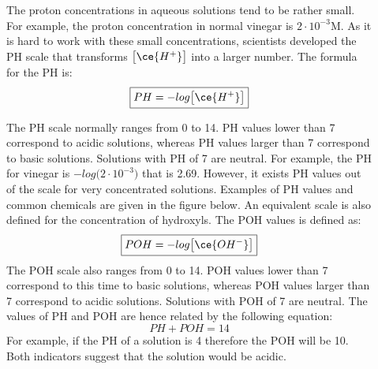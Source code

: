 \documentclass[main.tex]{subfiles}
\newcommand\chapterlabel{acids}
\begin{document}
\begin{description}
\item[] The proton concentrations in aqueous solutions tend to be rather small. For example, the proton concentration in normal vinegar is $2\cdot 10^{-3}$M. As it is hard to work with these small concentrations, scientists developed the PH scale that transforms $\big[ \ce{H^+}\big]$ into a larger number. The formula for the PH is:
\begin{equation}
\boxed{PH=-log \big[ \ce{H^+} \big]  }\label{\chapterlabel:equation3}
\end{equation}

 
The PH scale normally ranges from 0 to 14. PH values lower than 7 correspond to acidic solutions, whereas PH values larger than 7 correspond to basic solutions. Solutions with PH of 7 are neutral. 
For example, the PH for vinegar is $-log \big( 2\cdot 10^{-3}\big)$ that is 2.69. However, it exists PH values out of the scale for very concentrated solutions. Examples of PH values and common chemicals are given in the figure below.
An equivalent scale is also defined for the concentration of hydroxyls. The POH values is defined as:
\begin{equation}
\boxed{POH=-log \big[ \ce{OH^-} \big]  }\label{\chapterlabel:equation4}
\end{equation}
The POH scale also ranges from 0 to 14. POH values lower than 7 correspond to this time to basic solutions, whereas POH values larger than 7 correspond to acidic solutions. Solutions with POH of 7 are neutral. The values of PH and POH are hence related by the following equation:
\begin{equation}
\boxed{PH + POH = 14  }\label{\chapterlabel:equation5}
\end{equation}
For example, if the PH of a solution is 4 therefore the POH will be 10. Both indicators suggest that the solution would be acidic.

\begin{figure}[h] %
\end{figure}
\end{description}
\end{document}
